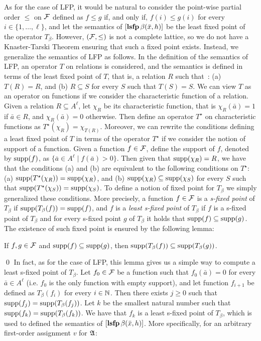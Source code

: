 As for the case of LFP, it would be natural to consider the point-wise partial order $\leq$ on $\mathcal{F}$ defined as $f \leq g$ if, and only if, $f(i) \leq g(i)$ for every $i \in \{1, \ldots, \ell\}$, and let the semantics of $[{\bf lsfp} \, \beta(\bar{x},h)]$ be the least fixed point of the operator $T_\beta$. However, $(\mathcal{F}, \leq)$ is not a complete lattice, so we do not have a Knaster-Tarski Theorem ensuring that such a fixed point exists. Instead, we generalize the semantics of LFP as follows. In the definition of the semantics of LFP, an operator $T$ on relations is considered, and the semantics is defined in terms of the least fixed point of $T$, that is, a relation $R$ such that~\cite{I86,vardi1982complexity}: 
(a) $T(R) = R$, and (b) $R \subseteq S$ for every $S$ such that $T(S) = S$. 
We can view $T$ as an operator on functions if we consider the characteristic function of a relation. Given a relation $R \subseteq A^\ell$, let $\chi_R$ be its characteristic function, that is $\chi_R(\bar a) = 1$ if $\bar a \in R$, and $\chi_R(\bar a) = 0$ otherwise. Then define an operator $T^\star$ on characteristic functions as $T^\star(\chi_R) = \chi_{T(R)}$. Moreover, we can rewrite the conditions defining a least fixed point of $T$ in terms of the operator $T^\star$ if we consider the notion of support of a function. Given a function $f \in \mathcal{F}$, define the support of $f$, denoted by $\text{\rm supp}(f)$, as $\{ \bar a \in A^\ell \mid f(\bar a) > 0 \}$. Then given that $\text{\rm supp}(\chi_R) = R$, we have that the conditions (a) and (b) are equivalent to the following conditions on $T^\star$:
(a) $\text{\rm supp}(T^\star(\chi_R)) = \text{\rm supp}(\chi_R)$, and  (b) $\text{\rm supp}(\chi_R) \subseteq \text{\rm supp}(\chi_S)$ for every $S$ such that  $\text{\rm supp}(T^\star(\chi_{S})) = \text{\rm supp}(\chi_S)$.
To define a notion of fixed point for $T_\beta$ we simply generalized these conditions. More precisely, a function $f \in \mathcal{F}$ is a {\em s-fixed point} of $T_{\beta}$ if $\text{\rm supp}(T_\beta(f)) = \text{\rm supp}(f)$, and $f$ is a {\em least s-fixed point} of $T_{\beta}$ if $f$ is a s-fixed point of $T_\beta$ and for every s-fixed point $g$ of $T_\beta$ it holds that $\text{\rm supp}(f) \subseteq \text{\rm supp}(g)$. The existence of such fixed point is ensured by the following lemma:
\begin{lem}\label{lem-support}
If $f,g \in \mathcal{F}$ and $\text{\rm supp}(f) \subseteq \text{\rm supp}(g)$, then $\text{\rm supp}(T_\beta(f)) \subseteq \text{\rm supp}(T_\beta(g))$.
\end{lem}
\proof

\qed
In fact, as for the case of LFP, this lemma gives us a simple way to compute a least s-fixed point of $T_\beta$. Let $f_0 \in \mathcal{F}$ be a function such that $f_0(\bar a) = 0$ for every $\bar a \in A^\ell$ (i.e. $f_0$ is the only function with empty support), and let function $f_{i+1}$ be defined as $T_\beta(f_i)$ for every $i \in \mathbb{N}$. Then there exists $j \geq 0$ such that $\text{\rm supp}(f_j) = \text{\rm supp}(T_\beta(f_j))$. Let $k$ be the smallest natural number such that $\text{\rm supp}(f_{k}) = \text{\rm supp}(T_\beta(f_k))$. We have that $f_k$ is a least s-fixed point of $T_\beta$, which is used to defined the semantics of $[{\bf lsfp} \, \beta(\bar{x}, h)]$. More specifically, for an arbitrary first-order assignment $v$ for $\mathfrak{A}$:
